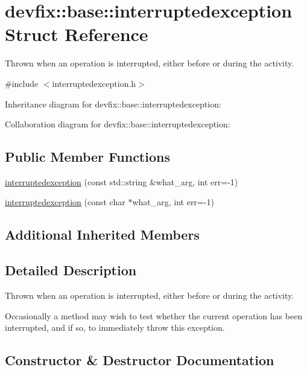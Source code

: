 \hypertarget{structdevfix_1_1base_1_1interruptedexception}{}\section{devfix\+:\+:base\+:\+:interruptedexception Struct Reference}
\label{structdevfix_1_1base_1_1interruptedexception}


Thrown when an operation is interrupted, either before or during the activity.  




{\ttfamily \#include $<$interruptedexception.\+h$>$}



Inheritance diagram for devfix\+:\+:base\+:\+:interruptedexception\+:


Collaboration diagram for devfix\+:\+:base\+:\+:interruptedexception\+:
\subsection*{Public Member Functions}
\begin{DoxyCompactItemize}
\item 
\hyperlink{structdevfix_1_1base_1_1interruptedexception_ac7860de3d6456588f4afb1cb5b517ff5}{interruptedexception} (const std\+::string \&what\+\_\+arg, int err=-\/1)
\item 
\hyperlink{structdevfix_1_1base_1_1interruptedexception_a3115c6a0ad2a463d04629df99ec4d119}{interruptedexception} (const char $\ast$what\+\_\+arg, int err=-\/1)
\end{DoxyCompactItemize}
\subsection*{Additional Inherited Members}


\subsection{Detailed Description}
Thrown when an operation is interrupted, either before or during the activity. 

Occasionally a method may wish to test whether the current operation has been interrupted, and if so, to immediately throw this exception. 

\subsection{Constructor \& Destructor Documentation}
\mbox{\label{structdevfix_1_1base_1_1interruptedexception_ac7860de3d6456588f4afb1cb5b517ff5}} 
